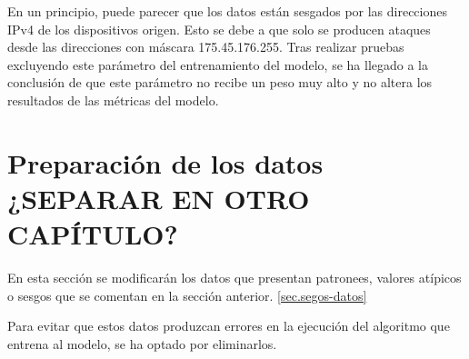 En un principio, puede parecer que los datos están sesgados por las direcciones IPv4 de los dispositivos origen. Esto se debe a que solo se producen ataques desde las direcciones con máscara 175.45.176.255. Tras realizar pruebas excluyendo este parámetro del entrenamiento del modelo, se ha llegado a la conclusión de que este parámetro no recibe un peso muy alto y no altera los resultados de las métricas del modelo.


\section{Preparación de los datos ¿SEPARAR EN OTRO CAPÍTULO?}\label{sec.preparacion-datos}
En esta sección se modificarán los datos que presentan patronees, valores atípicos o sesgos que se comentan en la sección anterior. \ref{sec.segos-datos}

 Para evitar que estos datos produzcan errores en la ejecución del algoritmo que entrena al modelo, se ha optado por eliminarlos.

